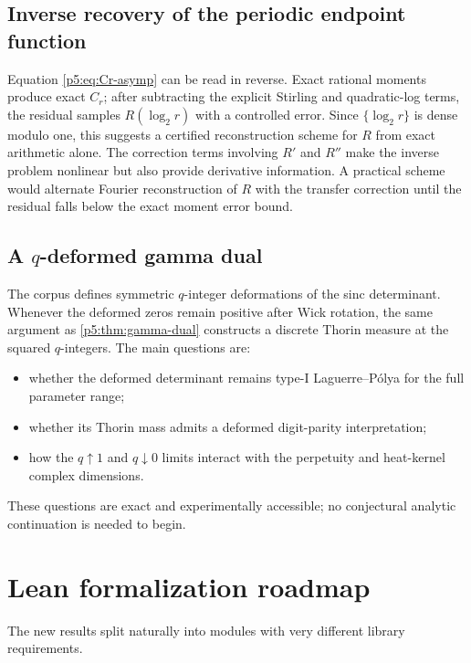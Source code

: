 \documentclass[11pt]{article}
\numberwithin{equation}{section}
\theoremstyle{definition}
\theoremstyle{remark}
\begin{document}
\subsection{Inverse recovery of the periodic endpoint function}

Equation \cref{p5:eq:Cr-asymp} can be read in reverse.  Exact rational moments
produce exact $C_r$; after subtracting the explicit Stirling and quadratic-log
terms, the residual samples $R(\log_2r)$ with a controlled error.  Since
$\{\log_2r\}$ is dense modulo one, this suggests a certified reconstruction
scheme for $R$ from exact arithmetic alone.  The correction terms involving
$R'$ and $R''$ make the inverse problem nonlinear but also provide derivative
information.  A practical scheme would alternate Fourier reconstruction of
$R$ with the transfer correction until the residual falls below the exact
moment error bound.

\subsection{A $q$-deformed gamma dual}

The corpus defines symmetric $q$-integer deformations of the sinc determinant.
Whenever the deformed zeros remain positive after Wick rotation, the same
argument as \cref{p5:thm:gamma-dual} constructs a discrete Thorin measure at the
squared $q$-integers.  The main questions are:
\begin{itemize}
\item whether the deformed determinant remains type-I Laguerre--P\'olya for the
      full parameter range;
\item whether its Thorin mass admits a deformed digit-parity interpretation;
\item how the $q\uparrow1$ and $q\downarrow0$ limits interact with the
      perpetuity and heat-kernel complex dimensions.
\end{itemize}
These questions are exact and experimentally accessible; no conjectural
analytic continuation is needed to begin.

\section{Lean formalization roadmap}

The new results split naturally into modules with very different library
requirements.
\end{document}
